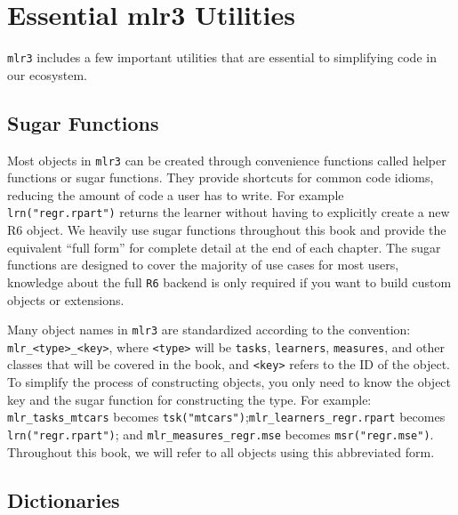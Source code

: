 \hypertarget{sec-mlr3-utilities}{%
\section{Essential mlr3 Utilities}\label{sec-mlr3-utilities}}

\texttt{mlr3} includes a few important utilities that are essential to
simplifying code in our ecosystem.

\hypertarget{sugar-functions}{%
\subsection*{Sugar Functions}\label{sugar-functions}}

Most objects in \texttt{mlr3} can be created through convenience
functions called helper functions or sugar
functions. They provide shortcuts for common code
idioms, reducing the amount of code a user has to write. For example
\texttt{lrn("regr.rpart")} returns the learner without having to
explicitly create a new R6 object. We heavily use sugar functions
throughout this book and provide the equivalent ``full form'' for
complete detail at the end of each chapter. The sugar functions are
designed to cover the majority of use cases for most users, knowledge
about the full \texttt{R6} backend is only required if you want to build
custom objects or extensions.

Many object names in \texttt{mlr3} are standardized according to the
convention:
\texttt{mlr\_\textless{}type\textgreater{}\_\textless{}key\textgreater{}},
where \texttt{\textless{}type\textgreater{}} will be \texttt{tasks},
\texttt{learners}, \texttt{measures}, and other classes that will be
covered in the book, and \texttt{\textless{}key\textgreater{}} refers to
the ID of the object. To simplify the process of constructing objects,
you only need to know the object key and the sugar function for
constructing the type. For example: \texttt{mlr\_tasks\_mtcars} becomes
\texttt{tsk("mtcars")};\texttt{mlr\_learners\_regr.rpart} becomes
\texttt{lrn("regr.rpart")}; and \texttt{mlr\_measures\_regr.mse} becomes
\texttt{msr("regr.mse")}. Throughout this book, we will refer to all
objects using this abbreviated form.

\hypertarget{dictionaries}{%
\subsection*{Dictionaries}\label{dictionaries}}


